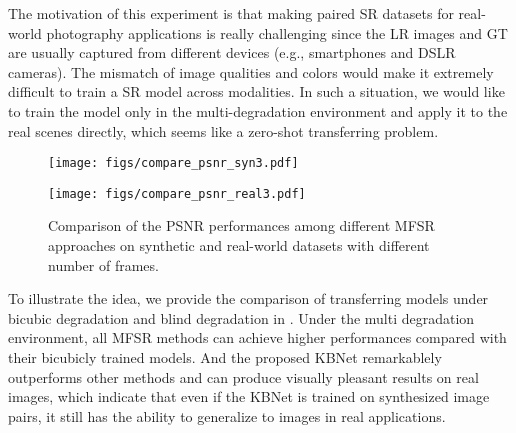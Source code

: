 The motivation of this experiment is that making paired SR datasets for real-world photography applications is really challenging since the LR images and GT are usually captured from different devices (e.g., smartphones and DSLR cameras). The mismatch of image qualities and colors would make it extremely difficult to train a SR model across modalities. 
In such a situation, we would like to train the model only in the multi-degradation environment and apply it to the real scenes directly, which seems like a zero-shot transferring problem. 


\begin{figure}[t]
\setlength{\abovecaptionskip}{0.04in}
\setlength{\belowcaptionskip}{-0.1in}
\centering
	\begin{minipage}[t]{0.495\linewidth}
		\centering
		\texttt{[image: figs/compare\_psnr\_syn3.pdf]}
	\end{minipage}
	\begin{minipage}[t]{0.495\linewidth}
		\centering
		\texttt{[image: figs/compare\_psnr\_real3.pdf]}
	\end{minipage}
	\caption{Comparison of the PSNR performances among different MFSR approaches on synthetic and real-world datasets with different number of frames.}
	\label{fig:cmp_psnr}
\end{figure}

To illustrate the idea, we provide the comparison of transferring models under bicubic degradation and blind degradation in . Under the multi degradation environment, all MFSR methods can achieve higher performances compared with their bicubicly trained models. And the proposed KBNet remarkablely outperforms other methods and can produce visually pleasant results on real images, which indicate that even if the KBNet is trained on synthesized image pairs, it still has the ability to generalize to images in real applications.

